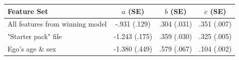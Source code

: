 \begin{table}[!h]
\centering
\begin{tabular}[t]{lccc}
\toprule
\textbf{Feature Set} & \textbf{$\mathit{a}$ (SE)} & \textbf{$\mathit{b}$ (SE)} & \textbf{$\mathit{c}$ (SE)}\\
\midrule
All features from winning model & -.931 (.129) & .304 (.031) & .351 (.007)\\
"Starter pack" file & -1.243 (.175) & .359 (.030) & .325 (.005)\\
Ego's age \& sex & -1.380 (.449) & .579 (.067) & .104 (.002)\\
\bottomrule
\end{tabular}
\end{table}
